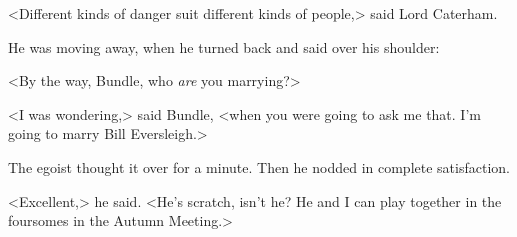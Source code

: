 <Different kinds of danger suit different kinds of people,> said Lord Caterham.

He was moving away, when he turned back and said over his shoulder:

<By the way, Bundle, who \emph{are} you marrying?>

<I was wondering,> said Bundle, <when you were going to ask me that. I'm going to marry Bill Eversleigh.>

The egoist thought it over for a minute. Then he nodded in complete satisfaction.

<Excellent,> he said. <He's scratch, isn't he? He and I can play together in the foursomes in the Autumn Meeting.>